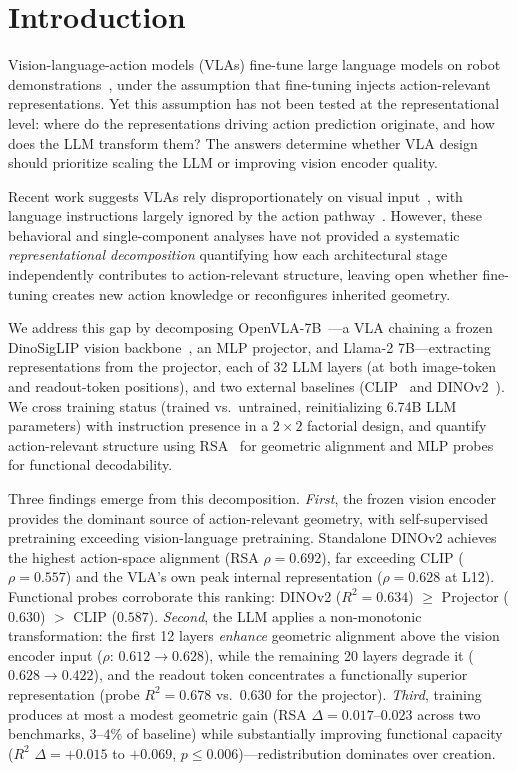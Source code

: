 \section{Introduction}
\label{sec:introduction}

Vision-language-action models (VLAs) fine-tune large language models on robot demonstrations~\cite{brohan2023_rt2,kim2024_openvla}, under the assumption that fine-tuning injects action-relevant representations.
Yet this assumption has not been tested at the representational level: where do the representations driving action prediction originate, and how does the LLM transform them?
The answers determine whether VLA design should prioritize scaling the LLM or improving vision encoder quality.

Recent work suggests VLAs rely disproportionately on visual input~\cite{grant2026}, with language instructions largely ignored by the action pathway~\cite{haon2025}.
However, these behavioral and single-component analyses have not provided a systematic \emph{representational decomposition} quantifying how each architectural stage independently contributes to action-relevant structure, leaving open whether fine-tuning creates new action knowledge or reconfigures inherited geometry.

We address this gap by decomposing OpenVLA-7B~\cite{kim2024_openvla,karamcheti2024}---a VLA chaining a frozen DinoSigLIP vision backbone~\cite{zhai2023_siglip,oquab2024_dinov2}, an MLP projector, and Llama-2 7B---extracting representations from the projector, each of 32 LLM layers (at both image-token and readout-token positions), and two external baselines (CLIP~\cite{radford2021_clip} and DINOv2~\cite{oquab2024_dinov2}).
We cross training status (trained vs.\ untrained, reinitializing 6.74B LLM parameters) with instruction presence in a $2\times 2$ factorial design, and quantify action-relevant structure using RSA~\cite{kriegeskorte2008} for geometric alignment and MLP probes~\cite{alain2017} for functional decodability.

Three findings emerge from this decomposition.
\emph{First}, the frozen vision encoder provides the dominant source of action-relevant geometry, with self-supervised pretraining exceeding vision-language pretraining.
Standalone DINOv2 achieves the highest action-space alignment (RSA $\rho = 0.692$), far exceeding CLIP ($\rho = 0.557$) and the VLA's own peak internal representation ($\rho = 0.628$ at L12).
Functional probes corroborate this ranking: DINOv2 ($R^2 = 0.634$) $\geq$ Projector ($0.630$) $>$ CLIP ($0.587$).
\emph{Second}, the LLM applies a non-monotonic transformation: the first 12 layers \emph{enhance} geometric alignment above the vision encoder input ($\rho$: $0.612 \to 0.628$), while the remaining 20 layers degrade it ($0.628 \to 0.422$), and the readout token concentrates a functionally superior representation (probe $R^2 = 0.678$ vs.\ $0.630$ for the projector).
\emph{Third}, training produces at most a modest geometric gain (RSA $\Delta = 0.017$--$0.023$ across two benchmarks, $3$--$4\%$ of baseline) while substantially improving functional capacity ($R^2$ $\Delta = +0.015$ to $+0.069$, $p \leq 0.006$)---redistribution dominates over creation.

